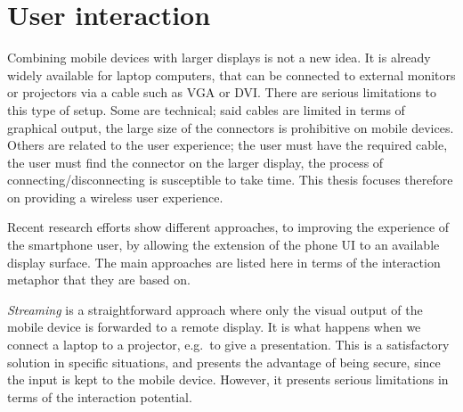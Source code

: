 
\section{User interaction}
\label{sec:rwinteraction}


Combining mobile devices with larger displays is not a new idea.
It is already widely available for laptop computers, that can be connected to external monitors or projectors via a cable such as VGA or DVI.
There are serious limitations to this type of setup.
Some are technical; said cables are limited in terms of graphical output, the large size of the connectors is prohibitive on mobile devices.
Others are related to the user experience; the user must have the required cable, the user must find the connector on the larger display, the process of connecting/disconnecting is susceptible to take time.
This thesis focuses therefore on providing a wireless user experience.

Recent research efforts show different approaches, to improving the experience of the smartphone user, by allowing the extension of the phone UI to an available display surface.
The main approaches are listed here in terms of the interaction metaphor that they are based on.

\emph{Streaming} is a straightforward approach where only the visual output of the mobile device is forwarded to a remote display.
It is what happens when we connect a laptop to a projector, e.g.\ to give a presentation.
This is a satisfactory solution in specific situations, and presents the advantage of being secure, since the input is kept to the mobile device.
However, it presents serious limitations in terms of the interaction potential.

